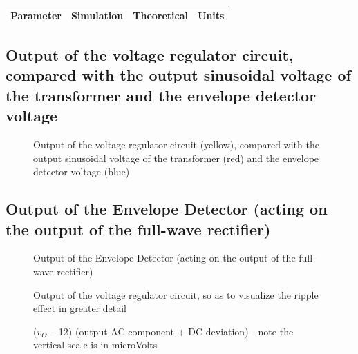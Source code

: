 \hfill
 \parbox{1\linewidth}{
  \centering
  \begin{tabular}{|l|l|l|r|}
    \hline    
    {\bf Parameter} & {\bf Simulation} & {\bf Theoretical } & {\bf Units }\\ \hline
    
  \end{tabular}
  \label{tab:results}
  }


  
\subsection{Output of the voltage regulator circuit, compared with the output sinusoidal voltage of the transformer and the envelope detector voltage}

\par
\begin{figure}[H] \centering
\caption{Output of the voltage regulator circuit (yellow), compared with the output sinusoidal voltage of the transformer (red) and the envelope detector voltage (blue)}
\label{fig:vs_venv_vout}
\end{figure}


\subsection{Output of the Envelope Detector (acting on the output of the full-wave rectifier)}

\par
\begin{figure}[H] \centering
\caption{Output of the Envelope Detector (acting on the output of the full-wave rectifier)}
\label{fig:env}
\end{figure}



\par
\begin{figure}[H] \centering
\caption{Output of the voltage regulator circuit, so as to visualize the ripple effect in greater detail}
\label{fig:vout}
\end{figure}

\par
\begin{figure}[H] \centering
\caption{($v_O$ – 12) (output AC component + DC deviation) - note the vertical scale is in microVolts}
\label{fig:deviation}
\end{figure}

\pagebreak
